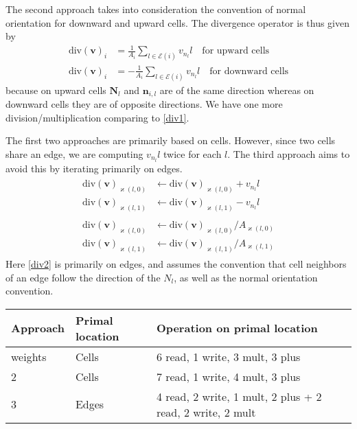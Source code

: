 \documentclass[12pt]{article}
\begin{document}
The second approach takes into consideration the convention of normal orientation for downward and upward cells. The divergence operator is thus given by
\begin{align}
  \text{div}(\bm{v})_i& = \frac{1}{A_i}\sum\limits_{l\in\mathcal{E}(i)}v_{n_l}l \quad \text{for upward cells} \\
  \text{div}(\bm{v})_i& = -\frac{1}{A_i}\sum\limits_{l\in\mathcal{E}(i)}v_{n_l}l \quad \text{for downward cells}
\end{align}
because on upward cells $\bm{N}_l$ and $\bm{n}_{i,l}$ are of the same direction whereas on downward cells they are of opposite directions. We have one more division/multiplication comparing to \cref{div1}.

The first two approaches are primarily based on cells. However, since two cells share an edge, we are computing $v_{n_l}l$ twice for each $l$. The third approach aims to avoid this by iterating primarily on edges.
\begin{gather}
  \begin{split}
    \label{div2}
    \text{div}(\bm{v})_{\varkappa(l,0)} &\leftarrow \text{div}(\bm{v})_{\varkappa(l,0)} + v_{n_l}l\\
    \text{div}(\bm{v})_{\varkappa(l,1)} &\leftarrow \text{div}(\bm{v})_{\varkappa(l,1)} - v_{n_l}l
  \end{split}\\
  \begin{split}
    \label{div2}
    \text{div}(\bm{v})_{\varkappa(l,0)} &\leftarrow \text{div}(\bm{v})_{\varkappa(l,0)} / A_{\varkappa(l,0)}\\
    \text{div}(\bm{v})_{\varkappa(l,1)} &\leftarrow \text{div}(\bm{v})_{\varkappa(l,1)} / A_{\varkappa(l,1)}
  \end{split}
\end{gather}
Here \cref{div2} is primarily on edges, and assumes the convention that cell neighbors of an edge follow the direction of the $N_l$, as well as the normal orientation convention.

\begin{table}[htbp]
\centering
\begin{tabular}{lll}
\toprule
Approach & Primal location & Operation on primal location\\
\midrule
weights & Cells & 6 read, 1 write, 3 mult, 3 plus\\
2 & Cells & 7 read, 1 write, 4 mult, 3 plus\\
3 & Edges & 4 read, 2 write, 1 mult, 2 plus + 2 read, 2 write, 2 mult\\
\bottomrule
\end{tabular}
\end{table}
\end{document}
